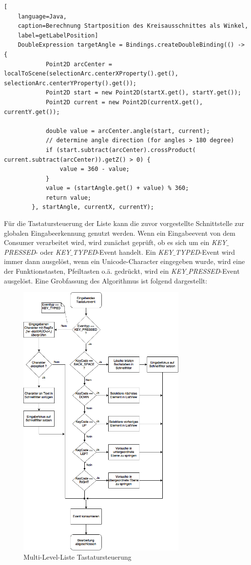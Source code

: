 \begin{lstlisting}[
    language=Java,
    caption=Berechnung Startposition des Kreisausschnittes als Winkel,
    label=getLabelPosition]
    DoubleExpression targetAngle = Bindings.createDoubleBinding(() -> {
            Point2D arcCenter = localToScene(selectionArc.centerXProperty().get(), selectionArc.centerYProperty().get());
            Point2D start = new Point2D(startX.get(), startY.get());
            Point2D current = new Point2D(currentX.get(), currentY.get());

            double value = arcCenter.angle(start, current);
            // determine angle direction (for angles > 180 degree)
            if (start.subtract(arcCenter).crossProduct( current.subtract(arcCenter)).getZ() > 0) {
                value = 360 - value;
            }
            value = (startAngle.get() + value) % 360;
            return value;
        }, startAngle, currentX, currentY);
\end{lstlisting}
Für die Tastatursteuerung der Liste kann die zuvor vorgestellte Schnittstelle zur globalen Eingabeerkennung genutzt werden. Wenn ein Eingabeevent von dem Consumer verarbeitet wird, wird zunächst geprüft, ob es sich um ein \textit{KEY$\_$PRESSED}- oder \textit{KEY$\_$TYPED}-Event handelt. Ein \textit{KEY$\_$TYPED}-Event wird immer dann ausgelöst, wenn ein Unicode-Character eingegeben wurde, wird eine der Funktionstasten, Pfeiltasten o.ä. gedrückt, wird ein \textit{KEY$\_$PRESSED}-Event ausgelöst. Eine Grobfassung des Algorithmus ist folgend dargestellt:\par
\begin{figure}[H]
 \centering
 \includegraphics[width=0.75\textwidth]{grafiken/MLL_KeyCapture.png}
 \caption{Multi-Level-Liste Tastatursteuerung}
 \label{fig:mllKeyCapture}
\end{figure}
